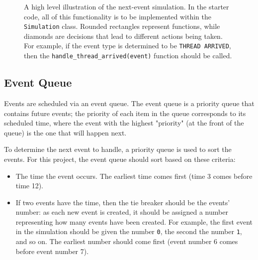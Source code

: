 \documentclass[main.tex]{subfiles}
\begin{document}
\begin{figure}
    \centering
    
    \caption{A high level illustration of the next-event simulation. In the starter code, all of this functionality is to be implemented within the \texttt{Simulation} class. Rounded rectangles represent functions, while diamonds are decisions that lead to different actions being taken. For example, if the event type is determined to be \texttt{THREAD ARRIVED}, then the \texttt{handle\_thread\_arrived(event)} function should be called.}
    \label{fig:des}
\end{figure}


\subsection{Event Queue}

Events are scheduled via an event queue. The event queue is a priority queue that contains future events;
the priority of each item in the queue corresponds to its scheduled time, where the event with the highest
"priority" (at the front of the queue) is the one that will happen next.

To determine the next event to handle, a priority queue is used to sort the events. For this project, the event queue should sort based on these criteria:
\begin{itemize}
    \item The time the event occurs. The earliest time comes first (time 3 comes before time 12).
    \item If two events have the time, then the tie breaker should be the events' number: as each new event is created, it should be assigned a number representing how many events have been created. For example, the first event in the simulation should be given the number \texttt{0}, the second the number \texttt{1}, and so on. The earliest number should come first (event number 6 comes before event number 7).
\end{itemize}
\end{document}
